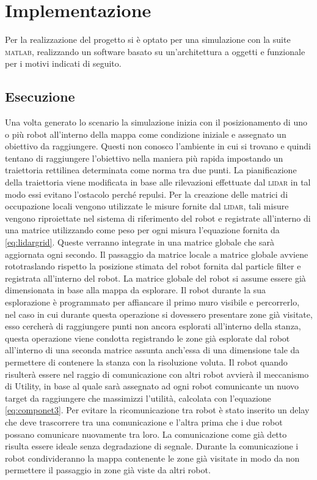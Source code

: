 \section{Implementazione}
\label{sec:implementazione}
Per la realizzazione del progetto si è optato per una simulazione con la suite
\textsc{matlab}, realizzando un software basato su un'architettura a oggetti
e funzionale per i motivi indicati di seguito.


%
\subsection{Esecuzione}
Una volta generato lo scenario la simulazione inizia con il posizionamento di
uno o più robot all'interno della mappa come condizione iniziale e assegnato un
obiettivo da raggiungere.
Questi non conosco l'ambiente in cui si trovano e quindi tentano di raggiungere
l'obiettivo nella maniera più rapida impostando un traiettoria rettilinea
determinata come norma tra due punti.
La pianificazione della traiettoria viene modificata in base alle rilevazioni
effettuate dal \textsc{lidar} in tal modo essi evitano l'ostacolo perché
repulsi.
Per la creazione delle matrici di occupazione locali vengono utilizzate le
misure fornite dal \textsc{lidar}, tali misure vengono riproiettate nel sistema 
di riferimento del robot e registrate all'interno di una matrice utilizzando 
come peso per ogni misura l'equazione fornita da \eqref{eq:lidargrid}.
Queste verranno integrate in una matrice globale che sarà aggiornata ogni
secondo.
Il passaggio da matrice locale a matrice globale avviene rototraslando rispetto
la posizione stimata del robot fornita dal particle filter e registrata
all'interno del robot.
La matrice globale del robot si assume essere già dimensionata in base alla 
mappa da esplorare.
Il robot durante la sua esplorazione è programmato per affiancare il primo muro
visibile e percorrerlo, nel caso in cui durante questa operazione si dovessero
presentare zone già visitate, esso cercherà di raggiungere punti non ancora
esplorati all'interno della stanza, questa operazione viene condotta registrando
le zone già esplorate dal robot all'interno di una seconda matrice assunta
anch'essa di una dimensione tale da permettere di contenere la stanza con la
risoluzione voluta.
Il robot quando risulterà essere nel raggio di comunicazione con altri robot
avvierà il meccanismo di Utility, in base al quale sarà assegnato ad ogni robot
comunicante un nuovo target da raggiungere che massimizzi l'utilità, calcolata
con l'equazione \eqref{eq:componet3}.
Per evitare la ricomunicazione tra robot è stato inserito un delay che deve
trascorrere tra una comunicazione e l'altra prima che i due robot possano
comunicare nuovamente tra loro. 
La comunicazione come già detto risulta essere ideale senza degradazione di 
segnale.
Durante la comunicazione i robot condivideranno la mappa contenente le zone già
visitate in modo da non permettere il passaggio in zone già viste da altri
robot.